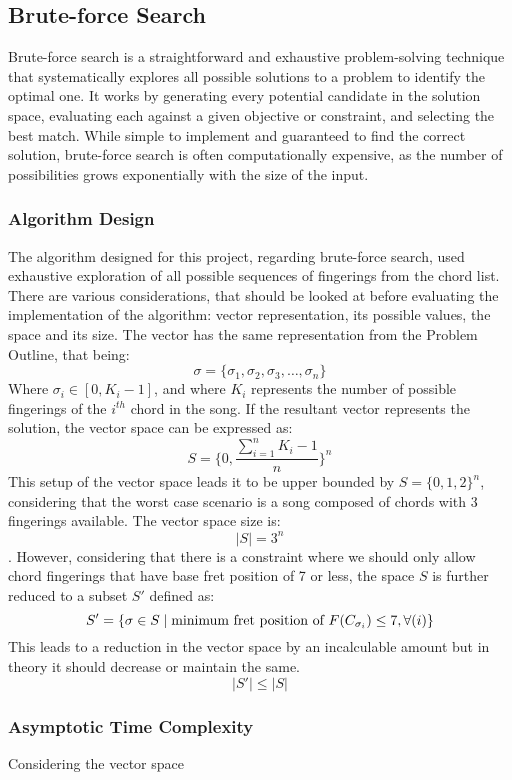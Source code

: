 \documentclass[conference]{IEEEtran}
\begin{document}
\subsection{Brute-force Search}
Brute-force search is a straightforward and exhaustive problem-solving technique that systematically explores all possible solutions to a problem to identify the optimal one. It works by generating every potential candidate in the solution space, evaluating each against a given objective or constraint, and selecting the best match. While simple to implement and guaranteed to find the correct solution, brute-force search is often computationally expensive, as the number of possibilities grows exponentially with the size of the input. 
\subsubsection{Algorithm Design}
The algorithm designed for this project, regarding brute-force search, used exhaustive exploration of all possible sequences of fingerings from the chord list. 
There are various considerations, that should be looked at before evaluating the implementation of the algorithm: vector representation, its possible values, the space and its size.
\newline 
\noindent The vector has the same representation from the Problem Outline, that being: \[ \sigma = \{\sigma_1, \sigma_2, \sigma_3, \ldots, \sigma_n\} \] 
\indent Where \(\sigma_i \in [0, K_i - 1]\), and where \( K_i \) represents the number of possible fingerings of the $i^{th}$ chord in the song. If the resultant vector represents the solution, the vector space can be expressed as:
\[ S = \{0, \frac{\sum_{i=1}^{n}K_i - 1}{n} \}^{n} \]
\indent This setup of the vector space leads it to be upper bounded by \( S = \{0,1,2\}^{n} \), considering that the worst case scenario is a song composed of chords with $3$ fingerings available. The vector space size is:
\[ |S| = 3^{n} \].
\indent However, considering that there is a constraint where we should only allow chord fingerings that have base fret position of 7 or less, the space $S$ is further reduced to a subset $S'$ defined as:
\[ S' = \{\sigma \in S \mid \text{minimum fret position of \( F(C_{\sigma_i}) \)} \leq 7, \forall(i)\} \]
\indent This leads to a reduction in the vector space by an incalculable amount but in theory it should decrease or maintain the same.
\[ |S'| \leq |S| \]

\subsubsection{Asymptotic Time Complexity}
Considering the vector space 
\end{document}
